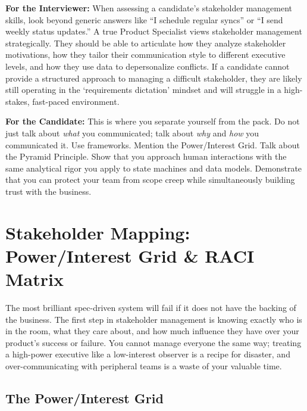 \documentclass[
  11pt,
  openany,
  oneside]{book}
\renewenvironment{quote}{\begin{customquote}}{\end{customquote}}
\begin{document}
\begin{quote}
\textbf{For the Interviewer:} When assessing a candidate's stakeholder
management skills, look beyond generic answers like ``I schedule regular
syncs'' or ``I send weekly status updates.'' A true Product Specialist
views stakeholder management strategically. They should be able to
articulate how they analyze stakeholder motivations, how they tailor
their communication style to different executive levels, and how they
use data to depersonalize conflicts. If a candidate cannot provide a
structured approach to managing a difficult stakeholder, they are likely
still operating in the `requirements dictation' mindset and will
struggle in a high-stakes, fast-paced environment.
\end{quote}

\begin{quote}
\textbf{For the Candidate:} This is where you separate yourself from the
pack. Do not just talk about \emph{what} you communicated; talk about
\emph{why} and \emph{how} you communicated it. Use frameworks. Mention
the Power/Interest Grid. Talk about the Pyramid Principle. Show that you
approach human interactions with the same analytical rigor you apply to
state machines and data models. Demonstrate that you can protect your
team from scope creep while simultaneously building trust with the
business.
\end{quote}

\bigskip

\section{Stakeholder Mapping: Power/Interest Grid \& RACI
Matrix}\label{stakeholder-mapping-powerinterest-grid-raci-matrix}

The most brilliant spec-driven system will fail if it does not have the
backing of the business. The first step in stakeholder management is
knowing exactly who is in the room, what they care about, and how much
influence they have over your product's success or failure. You cannot
manage everyone the same way; treating a high-power executive like a
low-interest observer is a recipe for disaster, and over-communicating
with peripheral teams is a waste of your valuable time.

\subsection{The Power/Interest Grid}\label{the-powerinterest-grid}
\end{document}
